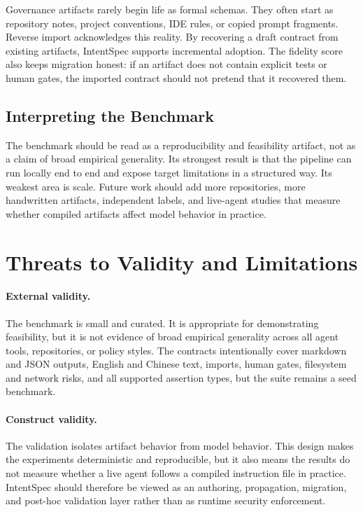 \documentclass[11pt]{article}
\begin{document}
Governance artifacts rarely begin life as formal schemas. They often start as
repository notes, project conventions, IDE rules, or copied prompt fragments.
Reverse import acknowledges this reality. By recovering a draft contract from
existing artifacts, IntentSpec supports incremental adoption. The fidelity score
also keeps migration honest: if an artifact does not contain explicit tests or
human gates, the imported contract should not pretend that it recovered them.

\subsection{Interpreting the Benchmark}

The benchmark should be read as a reproducibility and feasibility artifact, not as a
claim of broad empirical generality. Its strongest result is that the pipeline can
run locally end to end and expose target limitations in a structured way. Its
weakest area is scale. Future work should add more repositories, more handwritten
artifacts, independent labels, and live-agent studies that measure whether compiled
artifacts affect model behavior in practice.

\section{Threats to Validity and Limitations}

\paragraph{External validity.}
The benchmark is small and curated. It is appropriate for demonstrating feasibility,
but it is not evidence of broad empirical generality across all agent tools,
repositories, or policy styles. The contracts intentionally cover markdown and JSON
outputs, English and Chinese text, imports, human gates, filesystem and network
risks, and all supported assertion types, but the suite remains a seed benchmark.

\paragraph{Construct validity.}
The validation isolates artifact behavior from model behavior. This design makes the
experiments deterministic and reproducible, but it also means the results do not
measure whether a live agent follows a compiled instruction file in practice.
IntentSpec should therefore be viewed as an authoring, propagation, migration, and
post-hoc validation layer rather than as runtime security enforcement.
\end{document}
